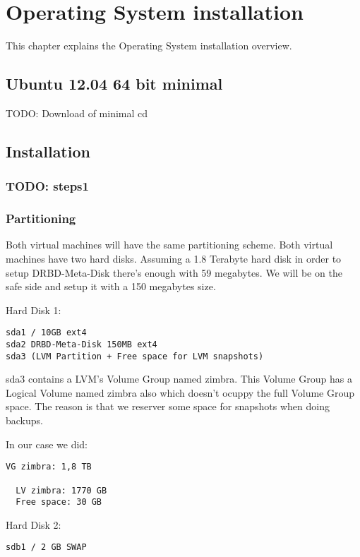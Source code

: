 

\chapter{Operating System installation}
This chapter explains the Operating System installation overview.

\section {Ubuntu 12.04 64 bit minimal}
TODO: Download of minimal cd

\section {Installation}
\subsection {TODO: steps1}
\subsection {Partitioning}
Both virtual machines will have the same partitioning scheme. Both virtual machines have two hard disks.
Assuming a 1.8 Terabyte hard disk in order to setup DRBD-Meta-Disk there's enough with 59 megabytes. We will be on the safe side and setup it with a 150 megabytes size.

Hard Disk 1:
\begin{verbatim}
sda1 / 10GB ext4
sda2 DRBD-Meta-Disk 150MB ext4
sda3 (LVM Partition + Free space for LVM snapshots)
\end{verbatim}

sda3 contains a LVM's Volume Group named zimbra.
This Volume Group has a Logical Volume named zimbra also which doesn't ocuppy the full Volume Group space. The reason is that we reserver some space for snapshots when doing backups.

In our case we did:
\begin{verbatim}
VG zimbra: 1,8 TB

  LV zimbra: 1770 GB
  Free space: 30 GB
\end{verbatim}


Hard Disk 2:
\begin{verbatim}
sdb1 / 2 GB SWAP
\end{verbatim}
